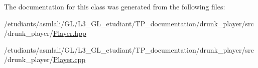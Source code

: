 The documentation for this class was generated from the following files\+:\begin{DoxyCompactItemize}
\item 
/etudiants/asmlali/\+G\+L/\+L3\+\_\+\+G\+L\+\_\+etudiant/\+T\+P\+\_\+documentation/drunk\+\_\+player/src/drunk\+\_\+player/\hyperlink{Player_8hpp}{Player.\+hpp}\item 
/etudiants/asmlali/\+G\+L/\+L3\+\_\+\+G\+L\+\_\+etudiant/\+T\+P\+\_\+documentation/drunk\+\_\+player/src/drunk\+\_\+player/\hyperlink{Player_8cpp}{Player.\+cpp}\end{DoxyCompactItemize}

